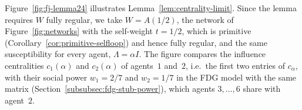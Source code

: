 Figure~\ref{fig:fj-lemma24} illustrates Lemma~\ref{lem:centrality-limit}. Since the
lemma requires $W$ fully regular, we take $W = A(1/2)$, the network of
Figure~\ref{fig:networks} with the self-weight $t = 1/2$, which is primitive
(Corollary~\ref{cor:primitive-selfloop}) and hence fully regular, and the same
susceptibility for every agent, $\Lambda = \alpha I$.
The figure compares the influence centralities $c_1(\alpha)$ and
$c_2(\alpha)$ of agents~$1$ and~$2$, i.e.\ the first two entries of $c_\alpha$, with their
social power $w_1 = 2/7$ and $w_2 = 1/7$ in the FDG model with the same matrix
(Section~\ref{subsubsec:fdg-stub-power}), which agents $3, \dots, 6$ share with agent~$2$.


